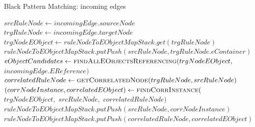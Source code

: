 \begin{algorithm}
    \caption{Black Pattern Matching: incoming edges}
    \label{alg:BackwardConversionPM:BlackMatching:IncomingEdges}
    \begin{algorithmic}
            \State $srcRuleNode \gets incomingEdge.sourceNode$
            \State $trgRuleNode \gets incomingEdge.targetNode$
                \State {}
            \EndIf
            \State $trgNodeEObject \gets ruleNodeToEObjectMapStack.get(trgRuleNode)$
                        \State $ruleNodeToEObjectMapStack.putPush(srcRuleNode, trgRuleNode.eContainer)$
                        \State {}
                \Else                
                    \State $eObjectCandidates \gets \Call{findAllEObjectsReferencing}{}(trgNodeEObject,$
                    \State \hspace{5.2cm} $incomingEdge.EReference)$
                    \State {}
                \EndIf
            \Else
                \State $correlatedRuleNode \gets \Call{getCorrelatedNode}{trgRuleNode, srcRuleNode}$
                    \State $(corrNodeInstance, correlatedEObject) \gets \Call{findCorrInstance}{}($
                    \State \hspace{5.2cm} $trgNodeEObject,$
                    \State \hspace{5.2cm} $srcRuleNode,$
                    \State \hspace{5.2cm} $correlatedRuleNode)$
                        \State $ruleNodeToEObjectMapStack.putPush(srcRuleNode, corrNodeInstance)$
                        \State $ruleNodeToEObjectMapStack.putPush(correlatedRuleNode, correlatedEObject)$
                        \State {}
                    \EndIf
                \EndIf
                \State {} 
            \EndIf
            \State {}
        \EndFunction
    \end{algorithmic}    
\end{algorithm}


